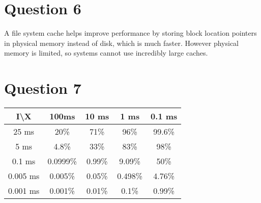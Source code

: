 \documentclass{article}
\begin{document}
\section*{Question 6}
A file system cache helps improve performance by
storing block location pointers in physical memory instead
of disk, which is much faster.
However physical memory is limited, so systems cannot 
use incredibly large caches.

\section*{Question 7}
\begin{tabular}{c||c|c|c|c}
    I\textbackslash X & 100ms & 10 ms & 1 ms & 0.1 ms \\
    \hline \hline
    25 ms & 20\% & 71\% & 96\% & 99.6\% \\
    5 ms & 4.8\% & 33\% & 83\% & 98\% \\
    0.1 ms & 0.0999\% & 0.99\% & 9.09\% & 50\% \\
    0.005 ms & 0.005\% & 0.05\% & 0.498\% & 4.76\% \\
    0.001 ms & 0.001\% & 0.01\% & 0.1\% & 0.99\% \\
    
\end{tabular}
\end{document}
